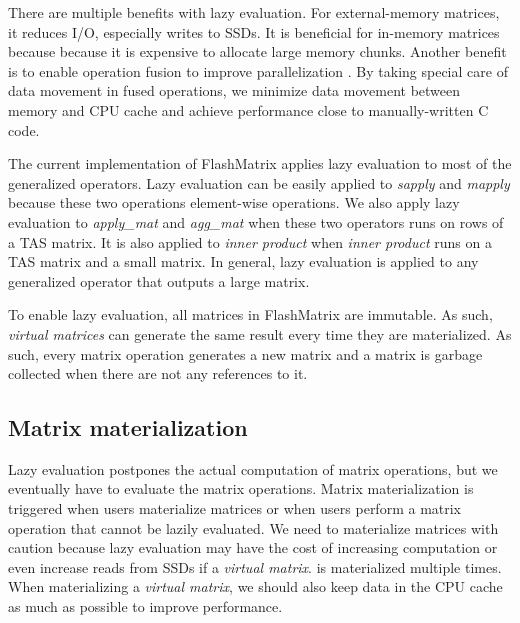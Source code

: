 There are multiple benefits with lazy evaluation. For external-memory matrices,
it reduces I/O, especially writes to SSDs. It is beneficial for in-memory
matrices because because it is expensive to allocate large memory chunks.
Another benefit is to enable operation fusion to improve parallelization
\cite{Ching12}. By taking special care of data movement in fused operations,
we minimize data movement between memory and CPU cache and achieve performance
close to manually-written C code.

The current implementation of FlashMatrix applies lazy evaluation to most of
the generalized operators. Lazy evaluation can be easily applied to
\textit{sapply} and \textit{mapply} because these two operations element-wise
operations. We also apply lazy evaluation to \textit{apply\_mat} and
\textit{agg\_mat} when these two operators runs on rows of a TAS matrix.
It is also applied to \textit{inner product} when \textit{inner product} runs
on a TAS matrix and a small matrix. In general, lazy evaluation is applied to
any generalized operator that outputs a large matrix.

To enable lazy evaluation, all matrices in FlashMatrix are immutable.
As such, \textit{virtual matrices} can generate the same result every time
they are materialized. As such, every matrix operation generates a new matrix
and a matrix is garbage collected when there are not any references to it.

\subsection{Matrix materialization}
Lazy evaluation postpones the actual computation of matrix operations,
but we eventually have to evaluate the matrix operations. Matrix materialization
is triggered when users materialize matrices or when users perform a matrix
operation that cannot be lazily evaluated. We need to materialize matrices
with caution because lazy evaluation may have the cost of increasing
computation or even increase reads from SSDs if a \textit{virtual matrix}.
is materialized multiple times. When materializing a \textit{virtual matrix},
we should also keep data in the CPU cache as much as possible to improve
performance.

